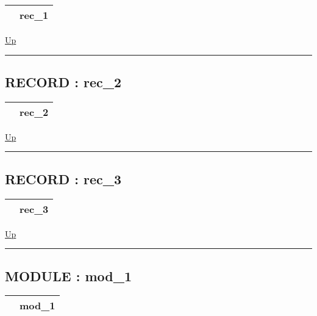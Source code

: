 {\renewcommand{\arraystretch}{1.5}
\begin{tabularx}{\textwidth}{|>{\raggedright\arraybackslash}l|X|}
\hline
\hspace{0pt} & rec\_1 \\
\hline
\end{tabularx}
}

\hyperlink{ecldoc:intest.in1intest.example_2}{Up}

\par


\rule{\textwidth}{0.4pt}
\subsection*{RECORD : rec\_2}
\hypertarget{ecldoc:intest.in1intest.example_2.rec_2}{}

{\renewcommand{\arraystretch}{1.5}
\begin{tabularx}{\textwidth}{|>{\raggedright\arraybackslash}l|X|}
\hline
\hspace{0pt} & rec\_2 \\
\hline
\end{tabularx}
}

\hyperlink{ecldoc:intest.in1intest.example_2}{Up}

\par


\rule{\textwidth}{0.4pt}
\subsection*{RECORD : rec\_3}
\hypertarget{ecldoc:intest.in1intest.example_2.rec_3}{}

{\renewcommand{\arraystretch}{1.5}
\begin{tabularx}{\textwidth}{|>{\raggedright\arraybackslash}l|X|}
\hline
\hspace{0pt} & rec\_3 \\
\hline
\end{tabularx}
}

\hyperlink{ecldoc:intest.in1intest.example_2}{Up}

\par


\rule{\textwidth}{0.4pt}
\subsection*{MODULE : mod\_1}
\hypertarget{ecldoc:intest.in1intest.example_2.mod_1}{}

{\renewcommand{\arraystretch}{1.5}
\begin{tabularx}{\textwidth}{|>{\raggedright\arraybackslash}l|X|}
\hline
\hspace{0pt} & mod\_1 \\
\hline
\end{tabularx}
}

